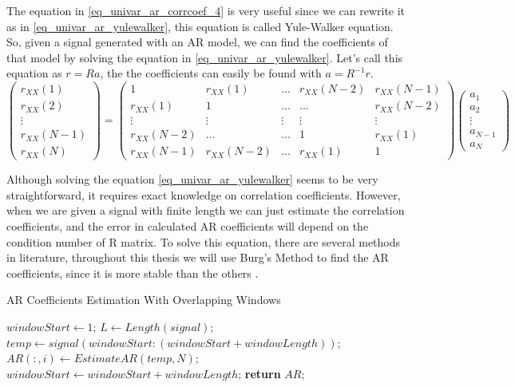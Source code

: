 The equation in \eqref{eq_univar_ar_corrcoef_4} is very useful since we can rewrite it as in \eqref{eq_univar_ar_yulewalker}, this equation is called Yule-Walker equation. So, given a signal generated with an AR model, we can find the coefficients of that model by solving the equation in \eqref{eq_univar_ar_yulewalker}. Let's call this equation as $r=Ra$, the the coefficients can easily be found with $a=R^{-1}r$. 
\begin{equation}\label{eq_univar_ar_yulewalker}
\begin{pmatrix}
r_{XX}(1) \\ 
r_{XX}(2) \\ 
\vdots \\ 
r_{XX}(N-1)\\ 
r_{XX}(N) 
\end{pmatrix} =  
\begin{pmatrix}
1 & r_{XX}(1) & ... & r_{XX}(N-2) & r_{XX}(N-1) \\
r_{XX}(1) & 1 & ... & ... & r_{XX}(N-2) \\
\vdots    & \vdots    & \vdots & \vdots & \vdots \\
r_{XX}(N-2) & ... & ... & 1 & r_{XX}(1) \\
r_{XX}(N-1) & r_{XX}(N-2) & ... & r_{XX}(1) & 1
\end{pmatrix} 
\begin{pmatrix} 
a_{1} \\ 
a_{2} \\
\vdots \\
a_{N-1} \\
a_{N} \end{pmatrix}
\end{equation} \par
Although solving the equation \eqref{eq_univar_ar_yulewalker} seems to be very straightforward, it requires exact knowledge on correlation coefficients. However, when we are given a signal with finite length we can just estimate the correlation coefficients, and the error in calculated AR coefficients will depend on the condition number of R matrix. To solve this equation, there are several methods in literature, throughout this thesis we will use Burg's Method to find the AR coefficients, since it is more stable than the others \cite{delft-burg}.
\begin{algorithm}
	\caption{AR Coefficients Estimation With Overlapping Windows}
	\label{Windowed AR}
	\begin{algorithmic}[1]
		\State $windowStart \gets 1$; $L \gets {Length(signal)}$;
		\State $temp \gets signal(windowStart:(windowStart+windowLength))$;
		\State $AR(:,i) \gets EstimateAR(temp, N)$;
		\State $windowStart \gets windowStart + windowLength$;
		\EndWhile
		\State \textbf{return} $AR$;
		\EndProcedure
	\end{algorithmic}
\end{algorithm}\\

